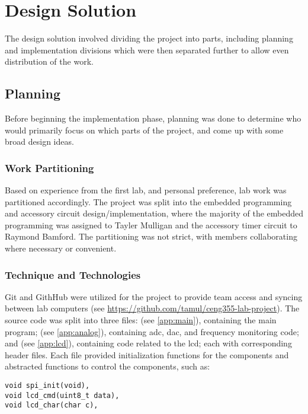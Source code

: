 
\section{Design Solution}
The design solution involved dividing the project into parts, including
planning and implementation divisions which were then separated further
to allow even distribution of the work.
\subsection{Planning}
Before beginning the implementation phase, planning was done to
determine who would primarily focus on which parts of the project, and
come up with some broad design ideas.
\subsubsection{Work Partitioning}
Based on experience from the first lab, and personal preference, lab
work was partitioned accordingly. The project was split into the
embedded programming and accessory circuit design/implementation, where
the majority of the embedded programming was assigned to Tayler Mulligan
and the accessory timer circuit to Raymond Bamford. The partitioning was
not strict, with members collaborating where necessary or convenient.

\subsubsection{Technique and Technologies}
Git and GithHub were utilized for the project to provide team access and
syncing between lab computers (see
\url{https://github.com/tamul/ceng355-lab-project}). The source code was
split into three files:  (see \ref{app:main}), containing the main program;
 (see \ref{app:analog}), containing \gls{adc},
\gls{dac}, and frequency monitoring
code; and  (see \ref{app:lcd}), containing code related
to the \gls{lcd}; each with corresponding header files. Each file
provided initialization functions for the components and abstracted
functions to control the components, such as:

\begin{lstlisting}[numbers=none]
void spi_init(void),
void lcd_cmd(uint8_t data),
void lcd_char(char c),
\end{lstlisting}

